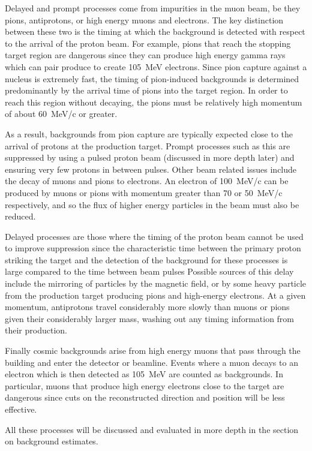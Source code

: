 Delayed and prompt processes come from impurities in the muon beam, be they pions, antiprotons, or high energy muons and electrons.
The key distinction between these two is the timing at which the background is detected with respect to the arrival of the proton beam.
For example, pions that reach the stopping target region are dangerous since they can produce high energy gamma rays which can pair produce to create 105~MeV electrons.
Since pion capture against a nucleus is extremely fast, the timing of pion-induced backgrounds is determined predominantly by the arrival time of pions into the target region.
In order to reach this region without decaying, the pions must be relatively high momentum of about 60~MeV/c or greater.  

As a result, backgrounds from pion capture are typically expected close to the arrival of protons at the production target.
Prompt processes such as this are suppressed by using a pulsed proton beam (discussed in more depth later) and ensuring very few protons in between pulses.
Other beam related issues include the decay of muons and pions to electrons.
An electron of 100~MeV/c can be produced by muons or pions with momentum greater than 70 or 50~MeV/c respectively, and so the flux of higher energy particles in the beam must also be reduced.

Delayed processes are those where the timing of the proton beam cannot be used to improve suppression since the characteristic time between the primary proton striking the target and the detection of the background for these processes is large compared to the time between beam pulses
Possible sources of this delay include the mirroring of particles by the magnetic field, or by some heavy particle from the production target producing pions and high-energy electrons.
At a given momentum, antiprotons travel considerably more slowly than muons or pions given their considerably larger mass, washing out any timing information from their production.

Finally cosmic backgrounds arise from high energy muons that pass through the building and enter the detector or beamline.  
Events where a muon decays to an electron which is then detected as 105~MeV are counted as backgrounds.
In particular, muons that produce high energy electrons close to the target are dangerous since cuts on the reconstructed direction and position will be less effective.

All these processes will be discussed and evaluated in more depth in the section on background estimates.

